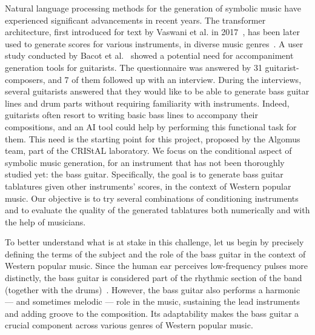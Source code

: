Natural language processing methods for the generation of symbolic music have experienced significant advancements in recent years.
The transformer architecture, first introduced for text by Vaswani et al. in 2017~\cite{vaswani_attention_2017}, has been later used to generate scores for various instruments, in diverse music genres~\cite{le_natural_2024}.
A user study conducted by Bacot et al.~\cite{bacot_tablature_2025} showed a potential need for accompaniment generation tools for guitarists.
The questionnaire was answered by 31 guitarist-composers, and 7 of them followed up with an interview.
During the interviews, several guitarists answered that they would like to be able to generate bass guitar lines and drum parts without requiring familiarity with instruments.
Indeed, guitarists often resort to writing basic bass lines to accompany their compositions, and an AI tool could help by performing this functional task for them.
This need is the starting point for this project, proposed by the Algomus team, part of the CRIStAL laboratory.
We focus on the conditional aspect of symbolic music generation, for an instrument that has not been thoroughly studied yet: the bass guitar.
Specifically, the goal is to generate bass guitar tablatures given other instruments' scores, in the context of Western popular music.
Our objective is to try several combinations of conditioning instruments and to evaluate the quality of the generated tablatures both numerically and with the help of musicians.


To better understand what is at stake in this challenge, let us begin by precisely defining the terms of the subject and the role of the bass guitar in the context of Western popular music.
Since the human ear perceives low-frequency pulses more distinctly, the bass guitar is considered part of the rhythmic section of the band (together with the drums)~\cite{hove_superior_2014}.
However, the bass guitar also performs a harmonic — and sometimes melodic — role in the music, sustaining the lead instruments and adding groove to the composition.
Its adaptability makes the bass guitar a crucial component across various genres of Western popular music.


